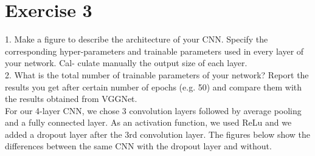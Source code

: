 \section*{Exercise 3}





1. Make a figure to describe the architecture of your CNN. Specify the corresponding
hyper-parameters and trainable parameters used in every layer of your network. Cal-
culate manually the output size of each layer. \\
2. What is the total number of trainable parameters of your network? Report the results
you get after certain number of epochs (e.g. 50) and compare them with the results
obtained from VGGNet.\\

For our 4-layer CNN, we chose 3 convolution layers followed by average pooling and a fully connected layer. As an activation function, we used ReLu and we added a dropout layer after the 3rd convolution layer. The figures below show the differences between the same CNN with the dropout layer and without.

